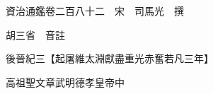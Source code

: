 










 


 
 


 

  
  
  
  
  





  
  
  
  
  
 
  

  

  
  
  



  

 
 

  
   




  

  
  


  　　資治通鑑卷二百八十二　宋　司馬光　撰

　　胡三省　音註

　　後晉紀三【起屠維太淵獻盡重光赤奮若凡三年】

　　高祖聖文章武明德孝皇帝中

